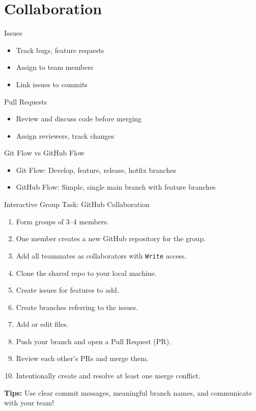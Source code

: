 \documentclass[aspectratio=169]{beamer} %
\begin{document}
\section{Collaboration}

\begin{frame}{Issues}
  \begin{itemize}
    \item Track bugs, feature requests
    \item Assign to team members
    \item Link issues to commits
  \end{itemize}
\end{frame}

\begin{frame}{Pull Requests}
  \begin{itemize}
    \item Review and discuss code before merging
    \item Assign reviewers, track changes
  \end{itemize}
\end{frame}

\begin{frame}{Git Flow vs GitHub Flow}
  \begin{itemize}
    \item Git Flow: Develop, feature, release, hotfix branches
    \item GitHub Flow: Simple, single main branch with feature branches
  \end{itemize}
\end{frame}

\begin{frame}{Interactive Group Task: GitHub Collaboration}

\begin{enumerate}
  \item Form groups of 3--4 members.
  \item One member creates a new GitHub repository for the group.
  \item Add all teammates as collaborators with \texttt{Write} access.
  \item Clone the shared repo to your local machine.
  \item Create issues for features to add.
  \item Create branches referring to the issues.
  \item Add or edit files.
  \item Push your branch and open a Pull Request (PR).
  \item Review each other's PRs and merge them.
  \item Intentionally create and resolve at least one merge conflict.
\end{enumerate}

\textbf{Tips:} Use clear commit messages, meaningful branch names, and communicate with your team!
\end{frame}
\end{document}
